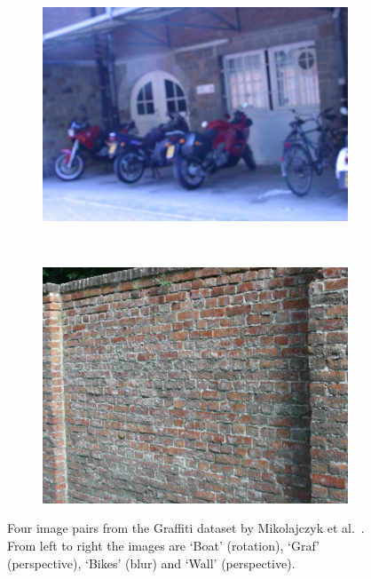 \documentclass[review]{elsarticle}
\begin{document}
\begin{figure}[b]
\begin{subfigure}[t]{0.23\columnwidth}
        \includegraphics[width=1\columnwidth]{images/acr/bikes6}
    \end{subfigure}%
    ~ %
    \begin{subfigure}[t]{0.21\columnwidth}
        \centering
        \includegraphics[width=1\columnwidth]{images/acr/wall4}
    \end{subfigure}%
    \caption{Four image pairs from the Graffiti dataset by Mikolajczyk et al.\ \cite{mikolajczyk2005performance}. From left to right the images are `Boat' (rotation), `Graf' (perspective), `Bikes' (blur) and `Wall' (perspective).}
    \label{fig:patch_objects}
\end{figure}
\end{document}
